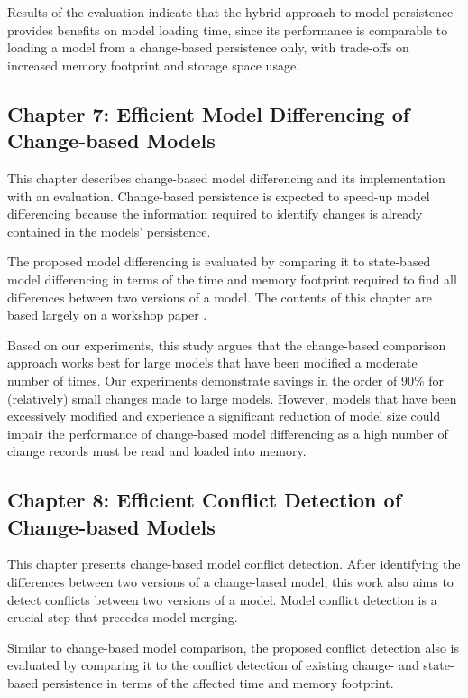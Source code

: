 Results of the evaluation indicate that the hybrid approach to model persistence provides benefits on model loading time, since its performance is comparable to loading a model from a change-based persistence only, with trade-offs on increased memory footprint and storage space usage.

\subsection{Chapter 7: Efficient Model Differencing of Change-based Models}
\label{sec:chapter_6_model_differencing}
This chapter describes change-based model differencing and its implementation with an evaluation. Change-based persistence is expected to speed-up model differencing because the information required to identify changes is already contained in the models’ persistence.

The proposed model differencing is evaluated by comparing it to state-based model differencing in terms of the time and memory footprint required to find all differences between two versions of a model. The contents of this chapter are based largely on a workshop paper \cite{yohannis2019efficient}.

Based on our experiments, this study argues that the change-based comparison approach works best for large models that have been modified a moderate number of times. Our experiments demonstrate savings in the order of 90\% for (relatively) small changes made to large models. However, models that have been excessively modified and experience a significant reduction of model size could impair the performance of change-based model differencing as a high number of change records must be read and loaded into memory.

\subsection{Chapter 8: Efficient Conflict Detection of Change-based Models}
\label{sec:chapter_7_conflict_detection}
This chapter presents change-based model conflict detection. After identifying the differences between two versions of a change-based model, this work also aims to detect conflicts between two versions of a model. Model conflict detection is a crucial step that precedes model merging.

Similar to change-based model comparison, the proposed conflict detection also is evaluated by comparing it to the conflict detection of existing change- and state-based persistence in terms of the affected time and memory footprint.

